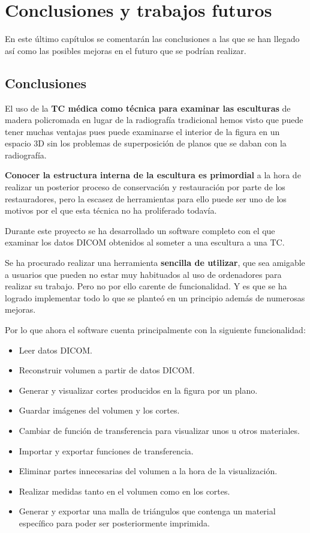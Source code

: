 \chapter{Conclusiones y trabajos futuros}

En este último capítulos se comentarán las conclusiones a las que se han llegado así como las posibles mejoras en el futuro que se podrían realizar.

\section{Conclusiones}

El uso de la \textbf{TC médica como técnica para examinar las esculturas} de madera policromada en lugar de la radiografía tradicional hemos visto que puede tener muchas ventajas pues puede examinarse el interior de la figura en un espacio 3D sin los problemas de superposición de planos que se daban con la radiografía.

\textbf{Conocer la estructura interna de la escultura es primordial} a la hora de realizar un posterior proceso de conservación y restauración por parte de los restauradores, pero la escasez de herramientas para ello puede ser uno de los motivos por el que esta técnica no ha proliferado todavía.

Durante este proyecto se ha desarrollado un software completo con el que examinar los datos DICOM obtenidos al someter a una escultura a una TC.

Se ha procurado realizar una herramienta \textbf{sencilla de utilizar}, que sea amigable a usuarios que pueden no estar muy habituados al uso de ordenadores para realizar su trabajo. Pero no por ello carente de funcionalidad. Y es que se ha logrado implementar todo lo que se planteó en un principio además de numerosas mejoras.

Por lo que ahora el software cuenta principalmente con la siguiente funcionalidad:

\begin{itemize}
	\item Leer datos DICOM.
	\item Reconstruir volumen a partir de datos DICOM.
	\item Generar y visualizar cortes producidos en la figura por un plano.
	\item Guardar imágenes del volumen y los cortes.
	\item Cambiar de función de transferencia para visualizar unos u otros materiales.
	\item Importar y exportar funciones de transferencia.
	\item Eliminar partes innecesarias del volumen a la hora de la visualización.
	\item Realizar medidas tanto en el volumen como en los cortes.
	\item Generar y exportar una malla de triángulos que contenga un material específico para poder ser posteriormente imprimida.
\end{itemize}

